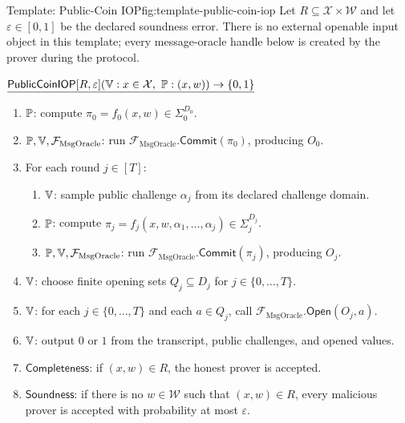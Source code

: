 \begin{protocolbox}{Template: Public-Coin IOP}{fig:template-public-coin-iop}
Let \(R\subseteq\mathcal X\times\mathcal W\) and let
\(\varepsilon\in[0,1]\) be the declared soundness error.  There is no external
openable input object in this template; every message-oracle handle below is
created by the prover during the protocol.

\smallskip
\noindent\(\underline{\mathsf{PublicCoinIOP}[R,\varepsilon](\mathbb{V}:x\in\mathcal X,\ \mathbb{P}:(x,w))\to\{0,1\}}\)

\smallskip
\begin{enumerate}[leftmargin=0.24in,label=\textbf{I\arabic*.},itemsep=0.08em,topsep=0.1em,parsep=0pt]
  \item \(\mathbb{P}\): compute
        \(\pi_0=f_0(x,w)\in\Sigma_0^{D_0}\).
  \item \(\mathbb{P},\mathbb{V},\mathcal F_{\mathrm{MsgOracle}}\): run
        \(\mathcal F_{\mathrm{MsgOracle}}.\mathsf{Commit}(\pi_0)\),
        producing \(O_0\).
  \item For each round \(j\in[T]\):
        \begin{enumerate}[leftmargin=0.2in,label=\textbf{I\arabic{enumi}.\arabic*.},itemsep=0.05em,topsep=0.05em,parsep=0pt]
          \item \(\mathbb{V}\): sample public challenge \(\alpha_j\) from its
                declared challenge domain.
          \item \(\mathbb{P}\): compute
                \(\pi_j=f_j(x,w,\alpha_1,\ldots,\alpha_j)\in\Sigma_j^{D_j}\).
          \item \(\mathbb{P},\mathbb{V},\mathcal F_{\mathrm{MsgOracle}}\): run
                \(\mathcal F_{\mathrm{MsgOracle}}.\mathsf{Commit}(\pi_j)\),
                producing \(O_j\).
        \end{enumerate}
  \item \(\mathbb{V}\): choose finite opening sets \(Q_j\subseteq D_j\) for
        \(j\in\{0,\ldots,T\}\).
  \item \(\mathbb{V}\): for each \(j\in\{0,\ldots,T\}\) and each
        \(a\in Q_j\), call
        \(\mathcal F_{\mathrm{MsgOracle}}.\mathsf{Open}(O_j,a)\).
  \item \(\mathbb{V}\): output \(0\) or \(1\) from the transcript, public
        challenges, and opened values.
  \item \(\mathsf{Completeness}\): if \((x,w)\in R\), the honest prover is
        accepted.
  \item \(\mathsf{Soundness}\): if there is no \(w\in\mathcal W\) such that
        \((x,w)\in R\), every malicious prover is accepted with probability at
        most \(\varepsilon\).
\end{enumerate}
\end{protocolbox}

